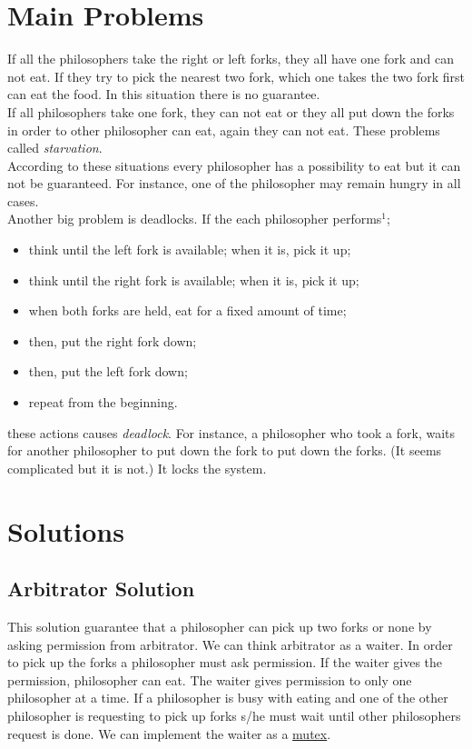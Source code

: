 \documentclass[12pt]{article}
\begin{document}
 \section*{Main Problems}
 \begin{flushleft}
  If all the philosophers take the right or left forks, they all have one fork and can not eat. If they try to pick the nearest 
  two fork, which one takes the two fork first can eat the food. In this situation there is no guarantee.\\
  \bigskip
  If all philosophers take one fork, they can not eat or they all put down the forks in order to other philosopher can eat, 
  again they can not eat. These problems called \emph{starvation}.\\
  \bigskip
  According to these situations every philosopher has a possibility to eat but it can not be guaranteed. For instance, one 
  of the philosopher may remain hungry in all cases.\\
  \bigskip
  Another big problem is deadlocks. If the each philosopher performs$^1$;
  \begin{itemize}
   \item think until the left fork is available; when it is, pick it up;
   \item think until the right fork is available; when it is, pick it up;
   \item when both forks are held, eat for a fixed amount of time;
   \item then, put the right fork down;
   \item then, put the left fork down;
   \item repeat from the beginning.
  \end{itemize}
  these actions causes \emph{deadlock}. For instance, a philosopher who took a fork, waits for another philosopher to put down the fork
  to put down the forks. (It seems complicated but it is not.) It locks the system.
 \end{flushleft}
 \pagebreak
 \section*{Solutions}
 \subsection*{Arbitrator Solution}
  \begin{flushleft}
   This solution guarantee that a philosopher can pick up two forks or none by asking permission from arbitrator. We can 
   think arbitrator as a waiter. In order to pick up the forks a philosopher must ask permission. If the waiter gives 
   the permission, philosopher can eat. The waiter gives permission to only one philosopher at a time. If a philosopher 
   is busy with eating and one of the other philosopher is requesting to pick up forks s/he must wait until other philosophers 
   request is done. We can implement the waiter as a \underline{mutex}. 
  \end{flushleft}
 
\end{document}
